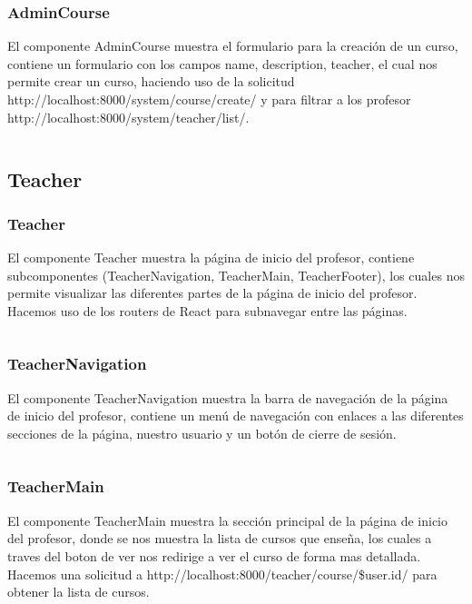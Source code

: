 \documentclass{article}
\begin{document}
\subsubsection{AdminCourse}
El componente AdminCourse muestra el formulario para la creación de un curso, contiene un formulario con los campos name, description, teacher, el cual nos permite crear un curso, haciendo uso de la solicitud http://localhost:8000/system/course/create/ y para filtrar a los profesor http://localhost:8000/system/teacher/list/.
\inputminted{javascript}{../fronted/src/designUI/Admin/AdminCourse.jsx}

\subsection{Teacher}
\subsubsection{Teacher}
El componente Teacher muestra la página de inicio del profesor, contiene subcomponentes (TeacherNavigation, TeacherMain, TeacherFooter), los cuales nos permite visualizar las diferentes partes de la página de inicio del profesor. Hacemos uso de los routers de React para subnavegar entre las páginas.
\inputminted{javascript}{../fronted/src/designUI/Teacher/Teacher.jsx}
\subsubsection{TeacherNavigation}
El componente TeacherNavigation muestra la barra de navegación de la página de inicio del profesor, contiene un menú de navegación con enlaces a las diferentes secciones de la página, nuestro usuario y un botón de cierre de sesión.
\inputminted{javascript}{../fronted/src/designUI/Teacher/TeacherNavigation.jsx}
\subsubsection{TeacherMain}
El componente TeacherMain muestra la sección principal de la página de inicio del profesor, donde se nos muestra la lista de cursos que enseña, los cuales a traves del boton de ver nos redirige a ver el curso de forma mas detallada. Hacemos una solicitud a http://localhost:8000/teacher/course/\${user.id}/ para obtener la lista de cursos.
\inputminted{javascript}{../fronted/src/designUI/Teacher/TeacherMain.jsx}
\end{document}
